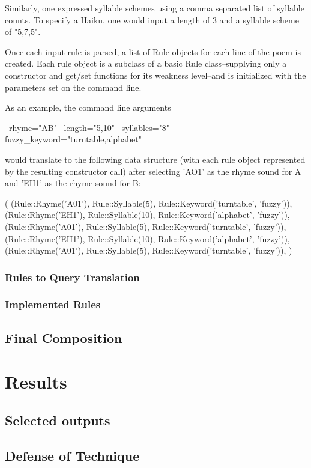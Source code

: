 \documentclass[10pt]{article}
\begin{document}
Similarly, one expressed syllable schemes using a comma separated list of
syllable counts. To specify a Haiku, one would input a length of 3 and a
syllable scheme of "5,7,5".

Once each input rule is parsed, a list of Rule objects for each line of the
poem is created. Each rule object is a subclass of a basic Rule
class--supplying only a constructor and get/set functions for its weakness
level--and is initialized with the parameters set on the command line.

As an example, the command line arguments

--rhyme="AB" --length="5,10" --syllables="8" --fuzzy\_keyword="turntable,alphabet"

would translate to the following data structure (with each rule object
represented by the resulting constructor call) after selecting 'AO1' as the
rhyme sound for A and 'EH1' as the rhyme sound for B:

(
    (Rule::Rhyme('A01'), Rule::Syllable(5), Rule::Keyword('turntable', 'fuzzy')),
    (Rule::Rhyme('EH1'), Rule::Syllable(10), Rule::Keyword('alphabet', 'fuzzy')),
    (Rule::Rhyme('A01'), Rule::Syllable(5), Rule::Keyword('turntable', 'fuzzy')),
    (Rule::Rhyme('EH1'), Rule::Syllable(10), Rule::Keyword('alphabet', 'fuzzy')),
    (Rule::Rhyme('A01'), Rule::Syllable(5), Rule::Keyword('turntable', 'fuzzy')),
)

\subsubsection{Rules to Query Translation}
\subsubsection{Implemented Rules}
\subsection{Final Composition}
\section{Results}
\subsection{Selected outputs}
\subsection{Defense of Technique}
\end{document}
